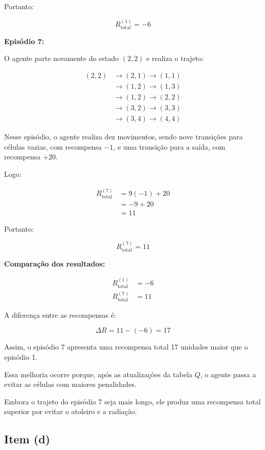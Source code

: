 Portanto:

\[
\boxed{R_{\text{total}}^{(1)}=-6}
\]

\textbf{Episódio 7:}

O agente parte novamente do estado $(2,2)$
e realiza o trajeto:

\[
\begin{aligned}
(2,2)&\rightarrow(2,1)\rightarrow(1,1)\\
&\rightarrow(1,2)\rightarrow(1,3)\\
&\rightarrow(1,2)\rightarrow(2,2)\\
&\rightarrow(3,2)\rightarrow(3,3)\\
&\rightarrow(3,4)\rightarrow(4,4)
\end{aligned}
\]

Nesse episódio, o agente realiza dez
movimentos, sendo nove transições para
células vazias, com recompensa $-1$,
e uma transição para a saída, com
recompensa $+20$.

Logo:

\[
\begin{aligned}
R_{\text{total}}^{(7)}
&=9(-1)+20\\
&=-9+20\\
&=11
\end{aligned}
\]

Portanto:

\[
\boxed{R_{\text{total}}^{(7)}=11}
\]

\textbf{Comparação dos resultados:}

\[
\begin{aligned}
R_{\text{total}}^{(1)}&=-6\\
R_{\text{total}}^{(7)}&=11
\end{aligned}
\]

A diferença entre as recompensas é:

\[
\Delta R=11-(-6)=17
\]

Assim, o episódio 7 apresenta uma
recompensa total 17 unidades maior
que o episódio 1.

Essa melhoria ocorre porque, após
as atualizações da tabela $Q$,
o agente passa a evitar as células
com maiores penalidades.

Embora o trajeto do episódio 7
seja mais longo, ele produz uma
recompensa total superior por
evitar o atoleiro e a radiação.


\subsection{Item (d)}


